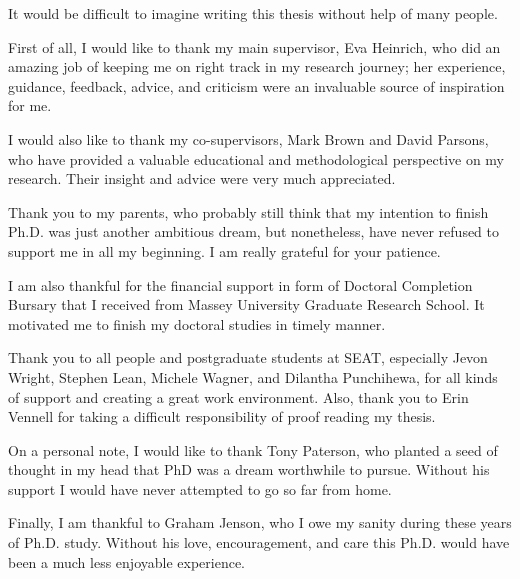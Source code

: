 It would be difficult to imagine writing this thesis without help of many
people.

First of all, I would like to thank my main supervisor, Eva Heinrich, who did
an amazing job of keeping me on right track in my research journey; her
experience, guidance, feedback, advice, and criticism were an invaluable source
of inspiration for me.

I would also like to thank my co-supervisors, Mark Brown and David Parsons, who
have provided a valuable educational and methodological perspective on my
research. Their insight and advice were very much appreciated.

Thank you to my parents, who probably still think that my intention to finish
Ph.D. was just another ambitious dream, but nonetheless, have never refused to
support me in all my beginning. I am really grateful for your patience.

I am also thankful for the financial support in form of Doctoral Completion
Bursary that I received from Massey University Graduate Research School. It
motivated me to finish my doctoral studies in timely manner.

Thank you to all people and postgraduate students at SEAT, especially Jevon
Wright, Stephen Lean, Michele Wagner, and Dilantha Punchihewa, for all kinds of
support and creating a great work environment. Also, thank you to Erin Vennell
for taking a difficult responsibility of proof reading my thesis.

On a personal note, I would like to thank Tony Paterson, who planted a seed of
thought in my head that PhD was a dream worthwhile to pursue. Without his
support I would have never attempted to go so far from home.

Finally, I am thankful to Graham Jenson, who I owe my sanity during these years
of Ph.D. study. Without his love, encouragement, and care this Ph.D. would have
been a much less enjoyable experience.
